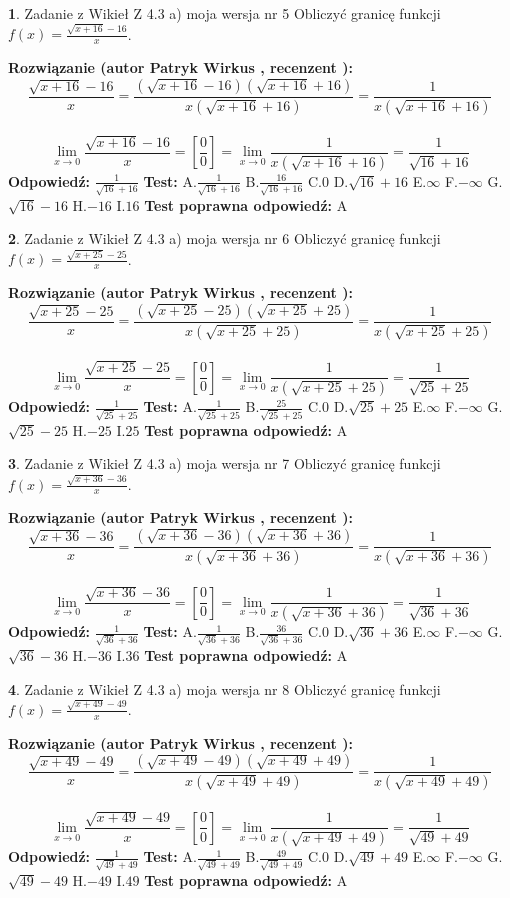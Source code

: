 \documentclass[12pt, a4paper]{article}
\theoremstyle{definition} %
\newtheorem{zad}{}
\newcommand{\zadStart}[1]{\begin{zad}#1\newline}
\newcommand{\zadStop}{\end{zad}}
\newcommand{\rozwStart}[2]{\noindent \textbf{Rozwiązanie (autor #1 , recenzent #2): }\newline}
\newcommand{\rozwStop}{\newline}
\newcommand{\odpStart}{\noindent \textbf{Odpowiedź:}\newline}
\newcommand{\odpStop}{\newline}
\newcommand{\testStart}{\noindent \textbf{Test:}\newline}
\newcommand{\testStop}{\newline}
\newcommand{\kluczStart}{\noindent \textbf{Test poprawna odpowiedź:}\newline}
\newcommand{\kluczStop}{\newline}
\begin{document}
\zadStart{Zadanie z Wikieł Z 4.3 a) moja wersja nr 5}
Obliczyć granicę funkcji $f(x)=\frac{\sqrt{x+16}-16}{x}$.
\zadStop
\rozwStart{Patryk Wirkus}{}
$$\frac{\sqrt{x+16}-16}{x}=\frac{(\sqrt{x+16}-16)(\sqrt{x+16}+16)}{x(\sqrt{x+16}+16)}=\frac{1}{x(\sqrt{x+16}+16)}$$
\\
$$\lim\limits_{x\to0}\frac{\sqrt{x+16}-16}{x}=[\frac{0}{0}]=
\lim\limits_{x\to0}\frac{1}{x(\sqrt{x+16}+16)} = \frac{1}{\sqrt{16}+16}$$
\rozwStop
\odpStart
$\frac{1}{\sqrt{16}+16}$
\odpStop
\testStart
A.$\frac{1}{\sqrt{16}+16}$
B.$\frac{16}{\sqrt{16}+16}$
C.$0$
D.$\sqrt{16}+16$
E.$\infty$
F.$-\infty$
G.$\sqrt{16}-16$
H.$-16$
I.$16$
\testStop
\kluczStart
A
\kluczStop



\zadStart{Zadanie z Wikieł Z 4.3 a) moja wersja nr 6}
Obliczyć granicę funkcji $f(x)=\frac{\sqrt{x+25}-25}{x}$.
\zadStop
\rozwStart{Patryk Wirkus}{}
$$\frac{\sqrt{x+25}-25}{x}=\frac{(\sqrt{x+25}-25)(\sqrt{x+25}+25)}{x(\sqrt{x+25}+25)}=\frac{1}{x(\sqrt{x+25}+25)}$$
\\
$$\lim\limits_{x\to0}\frac{\sqrt{x+25}-25}{x}=[\frac{0}{0}]=
\lim\limits_{x\to0}\frac{1}{x(\sqrt{x+25}+25)} = \frac{1}{\sqrt{25}+25}$$
\rozwStop
\odpStart
$\frac{1}{\sqrt{25}+25}$
\odpStop
\testStart
A.$\frac{1}{\sqrt{25}+25}$
B.$\frac{25}{\sqrt{25}+25}$
C.$0$
D.$\sqrt{25}+25$
E.$\infty$
F.$-\infty$
G.$\sqrt{25}-25$
H.$-25$
I.$25$
\testStop
\kluczStart
A
\kluczStop



\zadStart{Zadanie z Wikieł Z 4.3 a) moja wersja nr 7}
Obliczyć granicę funkcji $f(x)=\frac{\sqrt{x+36}-36}{x}$.
\zadStop
\rozwStart{Patryk Wirkus}{}
$$\frac{\sqrt{x+36}-36}{x}=\frac{(\sqrt{x+36}-36)(\sqrt{x+36}+36)}{x(\sqrt{x+36}+36)}=\frac{1}{x(\sqrt{x+36}+36)}$$
\\
$$\lim\limits_{x\to0}\frac{\sqrt{x+36}-36}{x}=[\frac{0}{0}]=
\lim\limits_{x\to0}\frac{1}{x(\sqrt{x+36}+36)} = \frac{1}{\sqrt{36}+36}$$
\rozwStop
\odpStart
$\frac{1}{\sqrt{36}+36}$
\odpStop
\testStart
A.$\frac{1}{\sqrt{36}+36}$
B.$\frac{36}{\sqrt{36}+36}$
C.$0$
D.$\sqrt{36}+36$
E.$\infty$
F.$-\infty$
G.$\sqrt{36}-36$
H.$-36$
I.$36$
\testStop
\kluczStart
A
\kluczStop



\zadStart{Zadanie z Wikieł Z 4.3 a) moja wersja nr 8}
Obliczyć granicę funkcji $f(x)=\frac{\sqrt{x+49}-49}{x}$.
\zadStop
\rozwStart{Patryk Wirkus}{}
$$\frac{\sqrt{x+49}-49}{x}=\frac{(\sqrt{x+49}-49)(\sqrt{x+49}+49)}{x(\sqrt{x+49}+49)}=\frac{1}{x(\sqrt{x+49}+49)}$$
\\
$$\lim\limits_{x\to0}\frac{\sqrt{x+49}-49}{x}=[\frac{0}{0}]=
\lim\limits_{x\to0}\frac{1}{x(\sqrt{x+49}+49)} = \frac{1}{\sqrt{49}+49}$$
\rozwStop
\odpStart
$\frac{1}{\sqrt{49}+49}$
\odpStop
\testStart
A.$\frac{1}{\sqrt{49}+49}$
B.$\frac{49}{\sqrt{49}+49}$
C.$0$
D.$\sqrt{49}+49$
E.$\infty$
F.$-\infty$
G.$\sqrt{49}-49$
H.$-49$
I.$49$
\testStop
\kluczStart
A
\kluczStop
\end{document}

